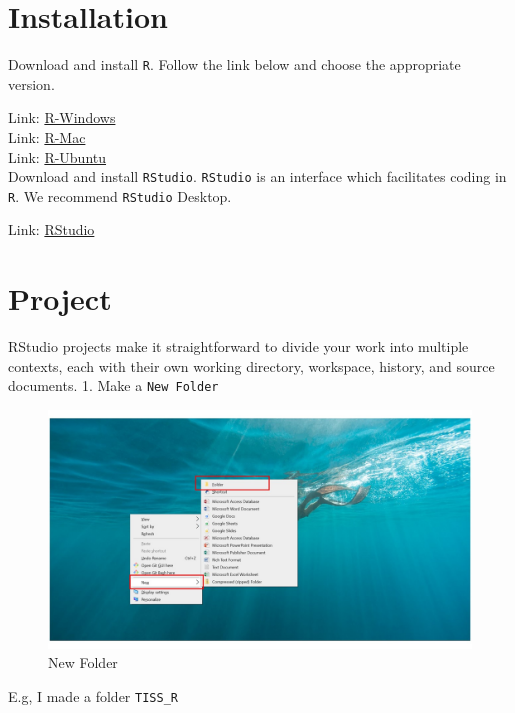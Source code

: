\documentclass[
]{book}
\begin{document}
\hypertarget{installation}{%
\section{Installation}\label{installation}}

Download and install \texttt{R}. Follow the link below and choose the appropriate version.

Link: \href{https://cran.r-project.org/bin/windows/base/}{R-Windows}\\
Link: \href{https://cran.r-project.org/bin/macosx/}{R-Mac}\\
Link: \href{https://cran.r-project.org/bin/linux/ubuntu/fullREADME.html}{R-Ubuntu}\\
Download and install \texttt{RStudio}. \texttt{RStudio} is an interface which facilitates coding in \texttt{R}. We recommend \texttt{RStudio} Desktop.

Link: \href{https://posit.co/download/rstudio-desktop/}{RStudio}

\hypertarget{project}{%
\section{Project}\label{project}}

RStudio projects make it straightforward to divide your work into multiple contexts, each with their own working directory, workspace, history, and source documents.
1. Make a \texttt{New\ Folder}

\begin{figure}

{\centering \includegraphics[width=0.7\linewidth]{pictures/Slide5} 

}

\caption{New Folder}\label{fig:unnamed-chunk-3}
\end{figure}

E.g, I made a folder \texttt{TISS\_R}
\end{document}
